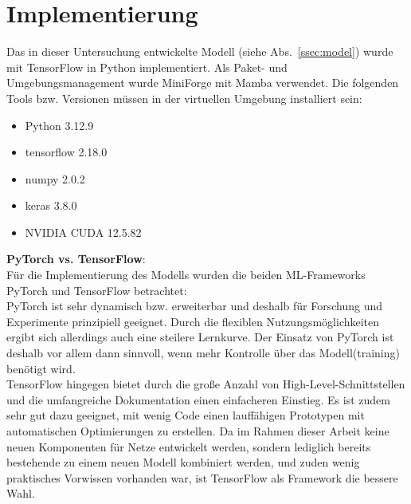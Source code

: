 \documentclass{article}
\begin{document}
\section{Implementierung}\label{sec:implementation}
Das in dieser Untersuchung entwickelte Modell (siehe Abs.~\ref{ssec:model}) wurde mit TensorFlow in Python implementiert.
Als Paket- und Umgebungsmanagement wurde MiniForge mit Mamba verwendet.
Die folgenden Tools bzw. Versionen müssen in der virtuellen Umgebung installiert sein:
\begin{itemize}
    \item Python 3.12.9
    \item tensorflow 2.18.0
    \item numpy 2.0.2
    \item keras 3.8.0
    \item NVIDIA CUDA 12.5.82
\end{itemize}
\textbf{PyTorch vs. TensorFlow}:\\
Für die Implementierung des Modells wurden die beiden ML-Frameworks PyTorch und TensorFlow betrachtet:
\\
PyTorch ist sehr dynamisch bzw. erweiterbar und deshalb für Forschung und Experimente prinzipiell geeignet.
Durch die flexiblen Nutzungsmöglichkeiten ergibt sich allerdings auch eine steilere Lernkurve.
Der Einsatz von PyTorch ist deshalb vor allem dann sinnvoll, wenn mehr Kontrolle über das Modell(training) benötigt wird.
\\
TensorFlow hingegen bietet durch die große Anzahl von High-Level-Schnittstellen und die umfangreiche Dokumentation einen einfacheren Einstieg.
Es ist zudem sehr gut dazu geeignet, mit wenig Code einen lauffähigen Prototypen mit automatischen Optimierungen zu erstellen.
Da im Rahmen dieser Arbeit keine neuen Komponenten für Netze entwickelt werden, sondern lediglich bereits bestehende zu einem neuen Modell kombiniert werden, und zuden wenig praktisches Vorwissen vorhanden war, ist TensorFlow als Framework die bessere Wahl.
\end{document}
